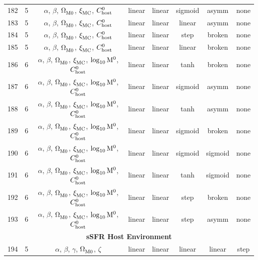 \begin{longtable}{c c c c c c c c}
    182 & 5 & $\alpha$, $\beta$, $\Omega_{\rm M0}^{}$, $\xi_{\rm MC}^{}$, $C_{\rm host}^{0}$ & linear & linear & sigmoid & asymm & none \\
    183 & 5 & $\alpha$, $\beta$, $\Omega_{\rm M0}^{}$, $\xi_{\rm MC}^{}$, $C_{\rm host}^{0}$ & linear & linear & linear & asymm & none \\
    184 & 5 & $\alpha$, $\beta$, $\Omega_{\rm M0}^{}$, $\xi_{\rm MC}^{}$, $C_{\rm host}^{0}$ & linear & linear & step & broken & none \\
    185 & 5 & $\alpha$, $\beta$, $\Omega_{\rm M0}^{}$, $\xi_{\rm MC}^{}$, $C_{\rm host}^{0}$ & linear & linear & linear & broken & none \\
    186 & 6 & $\alpha$, $\beta$, $\Omega_{\rm M0}^{}$, $\xi_{\rm MC}^{}$, $\log_{10}^{}{\rm M}^0$, $C_{\rm host}^{0}$ & linear & linear & tanh & broken & none \\
    187 & 6 & $\alpha$, $\beta$, $\Omega_{\rm M0}^{}$, $\xi_{\rm MC}^{}$, $\log_{10}^{}{\rm M}^0$, $C_{\rm host}^{0}$ & linear & linear & sigmoid & asymm & none \\
    188 & 6 & $\alpha$, $\beta$, $\Omega_{\rm M0}^{}$, $\xi_{\rm MC}^{}$, $\log_{10}^{}{\rm M}^0$, $C_{\rm host}^{0}$ & linear & linear & tanh & asymm & none \\
    189 & 6 & $\alpha$, $\beta$, $\Omega_{\rm M0}^{}$, $\xi_{\rm MC}^{}$, $\log_{10}^{}{\rm M}^0$, $C_{\rm host}^{0}$ & linear & linear & sigmoid & broken & none \\
    190 & 6 & $\alpha$, $\beta$, $\Omega_{\rm M0}^{}$, $\xi_{\rm MC}^{}$, $\log_{10}^{}{\rm M}^0$, $C_{\rm host}^{0}$ & linear & linear & sigmoid & sigmoid & none \\
    191 & 6 & $\alpha$, $\beta$, $\Omega_{\rm M0}^{}$, $\xi_{\rm MC}^{}$, $\log_{10}^{}{\rm M}^0$, $C_{\rm host}^{0}$ & linear & linear & tanh & sigmoid & none \\
    192 & 6 & $\alpha$, $\beta$, $\Omega_{\rm M0}^{}$, $\xi_{\rm MC}^{}$, $\log_{10}^{}{\rm M}^0$, $C_{\rm host}^{0}$ & linear & linear & step & broken & none \\
    193 & 6 & $\alpha$, $\beta$, $\Omega_{\rm M0}^{}$, $\xi_{\rm MC}^{}$, $\log_{10}^{}{\rm M}^0$, $C_{\rm host}^{0}$ & linear & linear & step & asymm & none \\
    \hline
    \multicolumn{8}{c}{\textbf{sSFR Host Environment}} \\
    \hline
    194 & 5 & $\alpha$, $\beta$, $\gamma$, $\Omega_{\rm M0}^{}$, $\zeta$ & linear & linear & linear & linear & step \\

\end{longtable}
